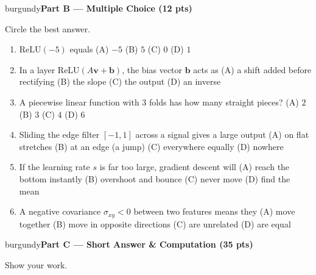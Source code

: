 \documentclass[10pt]{article}
\newcommand{\vv}{\mathbf{v}}
\newcommand{\bb}{\mathbf{b}}
\newcommand{\relu}{\mathrm{ReLU}}
\newcommand{\parthead}[1]{%
  \vspace{6pt}\noindent
  \begin{headlinebox}{burgundy}{\color{white}\bfseries #1}\end{headlinebox}%
  \vspace{4pt}}
\begin{document}
\parthead{Part B --- Multiple Choice (12 pts)}
Circle the best answer.

\begin{enumerate}[leftmargin=1.9em, itemsep=9pt]
  \item $\relu(-5)$ equals
    \hfill (A) $-5$ \quad (B) $5$ \quad (C) $0$ \quad (D) $1$
  \item In a layer $\relu(A\vv+\bb)$, the bias vector $\bb$ acts as
    \hfill (A) a shift added before rectifying \quad (B) the slope \quad (C) the output \quad (D) an inverse
  \item A piecewise linear function with $3$ folds has how many straight pieces?
    \hfill (A) $2$ \quad (B) $3$ \quad (C) $4$ \quad (D) $6$
  \item Sliding the edge filter $[-1,1]$ across a signal gives a large output
    \hfill (A) on flat stretches \quad (B) at an edge (a jump) \quad (C) everywhere equally \quad (D) nowhere
  \item If the learning rate $s$ is far too large, gradient descent will
    \hfill (A) reach the bottom instantly \quad (B) overshoot and bounce \quad (C) never move \quad (D) find the mean
  \item A negative covariance $\sigma_{xy}<0$ between two features means they
    \hfill (A) move together \quad (B) move in opposite directions \quad (C) are unrelated \quad (D) are equal
\end{enumerate}

\parthead{Part C --- Short Answer \& Computation (35 pts)}
Show your work.
\end{document}
